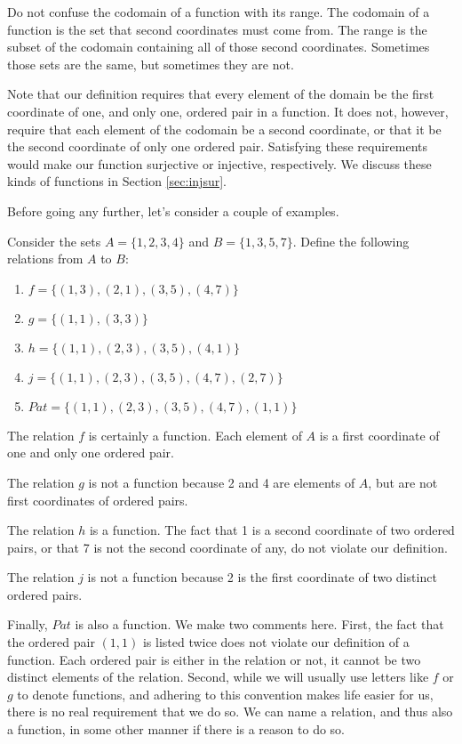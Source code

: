 Do not confuse the codomain of a function with its range.  The codomain of a function is the set that second coordinates must come from.  The range is the subset of the codomain containing all of those second coordinates. Sometimes those sets are the same, but sometimes they are not.

Note that our definition requires that every element of the domain be the first coordinate of one, and only one, ordered pair in a function. It does not, however, require that each element of the codomain be a second coordinate, or that it be the second coordinate of only one ordered pair.  Satisfying these requirements would make our function surjective or injective,   respectively.  We discuss these kinds of functions in Section \ref{sec:injsur}.

Before going any further, let's consider a couple of examples.

\begin{example}
Consider the sets $A=\{1,2,3,4\}$ and $B=\{1,3,5,7\}$.  Define the
following relations from $A$ to $B$:
\begin{enumerate}
\item $f=\{ (1,3),(2,1),(3,5),(4,7)\}$
\item $g=\{ (1,1),(3,3)\}$
\item $h=\{ (1,1),(2,3),(3,5),(4,1)\}$
\item $j=\{ (1,1),(2,3),(3,5),(4,7),(2,7)\}$
\item $Pat=\{ (1,1),(2,3),(3,5),(4,7),(1,1)\}$
\end{enumerate}

The relation $f$ is certainly a function.  Each element of $A$ is a first coordinate of one and only one ordered pair.

The relation $g$ is not a function because 2 and 4 are elements of $A$, but are not first coordinates of ordered pairs.

The relation $h$ is a function.  The fact that 1 is a second coordinate of two ordered pairs, or that 7 is not the second coordinate of any, do not violate our definition.

The relation $j$ is not a function because 2 is the first coordinate of two distinct ordered pairs.

Finally, $Pat$ is also a function.  We make two comments here.  First, the fact that the ordered pair $(1,1)$ is listed twice does not violate our definition of a function.  Each ordered pair is either in the relation or not, it cannot be two distinct elements of the relation. Second, while we will usually use letters like $f$ or $g$ to denote functions, and adhering to this convention makes life easier for us, there is no real requirement that we do so.  We can name a relation, and thus also a function, in some other manner if there is a reason to do so.
\end{example}

